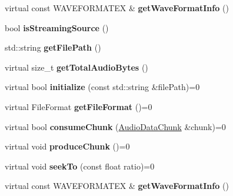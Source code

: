 \begin{DoxyCompactItemize}
virtual const W\+A\+V\+E\+F\+O\+R\+M\+A\+T\+EX \& {\bfseries get\+Wave\+Format\+Info} ()
\item 
\mbox{\label{classexperimental_1_1AudioSourceReader_a2d4844c402277b6a4be4c6afa511d4c4}} 
bool {\bfseries is\+Streaming\+Source} ()
\item 
\mbox{\label{classexperimental_1_1AudioSourceReader_a58efe6cbeff093588bc627d313931f34}} 
std\+::string {\bfseries get\+File\+Path} ()
\item 
\mbox{\label{classexperimental_1_1AudioSourceReader_a5ecffc8877c487d1a25b3c5c1d79103b}} 
virtual size\+\_\+t {\bfseries get\+Total\+Audio\+Bytes} ()
\item 
\mbox{\label{classexperimental_1_1AudioSourceReader_ac366f901eb0b2b1ab787d91ecf46fa95}} 
virtual bool {\bfseries initialize} (const std\+::string \&file\+Path)=0
\item 
\mbox{\label{classexperimental_1_1AudioSourceReader_a2a4c4f96f85b6de2c1ecdb3dde665336}} 
virtual File\+Format {\bfseries get\+File\+Format} ()=0
\item 
\mbox{\label{classexperimental_1_1AudioSourceReader_aa49d37bf7270cd32a8ee304e096defb9}} 
virtual bool {\bfseries consume\+Chunk} (\hyperlink{structexperimental_1_1AudioDataChunk}{Audio\+Data\+Chunk} \&chunk)=0
\item 
\mbox{\label{classexperimental_1_1AudioSourceReader_a96ccb23806da052c9362a37792d7f68f}} 
virtual void {\bfseries produce\+Chunk} ()=0
\item 
\mbox{\label{classexperimental_1_1AudioSourceReader_a5d87e5d81c458e5284f1708b99628941}} 
virtual void {\bfseries seek\+To} (const float ratio)=0
\item 
\mbox{\label{classexperimental_1_1AudioSourceReader_a373f99993ef8fd44f3fd8c4347350c2d}} 
virtual const W\+A\+V\+E\+F\+O\+R\+M\+A\+T\+EX \& {\bfseries get\+Wave\+Format\+Info} ()
\end{DoxyCompactItemize}
